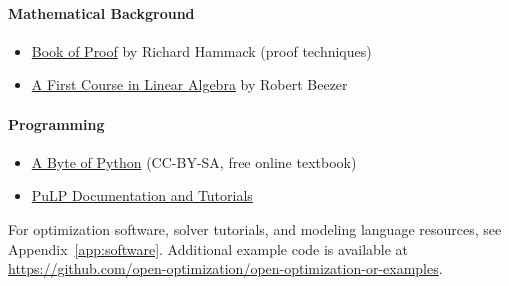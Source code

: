 \paragraph{\textbf{Mathematical Background}}
\begin{itemize}
\item \href{https://open.umn.edu/opentextbooks/textbooks/book-of-proof}{Book of Proof} by Richard Hammack (proof techniques)
\item \href{http://linear.ups.edu/html/fcla.html}{A First Course in Linear Algebra} by Robert Beezer
\end{itemize}

\paragraph{\textbf{Programming}}
\begin{itemize}
\item \href{https://open.umn.edu/opentextbooks/textbooks/a-byte-of-python}{A Byte of Python} (CC-BY-SA, free online textbook)
\item \href{https://coin-or.github.io/pulp/}{PuLP Documentation and Tutorials}
\end{itemize}

\noindent For optimization software, solver tutorials, and modeling language resources, see Appendix~\ref{app:software}. Additional example code is available at \url{https://github.com/open-optimization/open-optimization-or-examples}.
